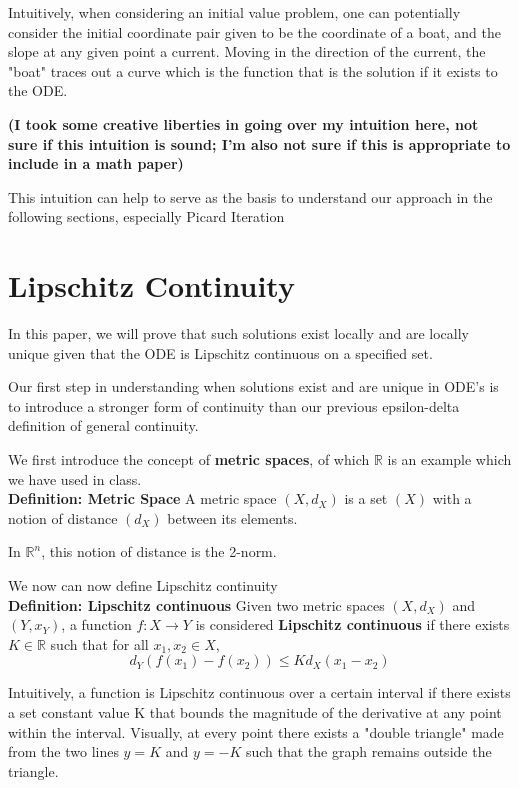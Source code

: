 \documentclass{article}
\begin{document}
Intuitively, when considering an initial value problem, one can potentially consider the initial coordinate pair given to be the coordinate of a boat, and the slope at any given point a current. Moving in the direction of the current, the "boat" traces out a curve which is the function that is the solution if it exists to the ODE.

\textbf{(I took some creative liberties in going over my intuition here, not sure if this intuition is sound; I'm also not sure if this is appropriate to include in a math paper)}

This intuition can help to serve as the basis to understand our approach in the following sections, especially Picard Iteration



\section{Lipschitz Continuity}
In this paper, we will prove that such solutions exist locally and are locally unique given that the ODE is Lipschitz continuous on a specified set.

Our first step in understanding when solutions exist and are unique in ODE's is to introduce a stronger form of continuity than our previous epsilon-delta definition of general continuity.

We first introduce the concept of \textbf{metric spaces}, of which $\mathbb{R}$ is an example which we have used in class. \\

\textbf{Definition: Metric Space} A metric space $(X, d_X)$ is a set $(X)$ with a notion of distance $(d_X)$ between its elements. 

In $\mathbb{R}^n$, this notion of distance is the 2-norm.

We now can now define Lipschitz continuity \\ 

\textbf{Definition: Lipschitz continuous} Given two metric spaces $(X, d_X)$ and $(Y, x_Y)$, a function $f: X \to Y$ is considered \textbf{Lipschitz continuous} if there exists $K \in \mathbb{R}$ such that for all $x_1, x_2 \in X$,
$$d_Y(f(x_1)-f(x_2)) \leq Kd_X(x_1-x_2)$$

Intuitively, a function is Lipschitz continuous over a certain interval if there exists a set constant value K that bounds the magnitude of the derivative at any point within the interval. Visually, at every point there exists a "double triangle" made from the two lines $y = K$ and $y = -K$ such that  the graph remains outside the triangle.\\
\end{document}
